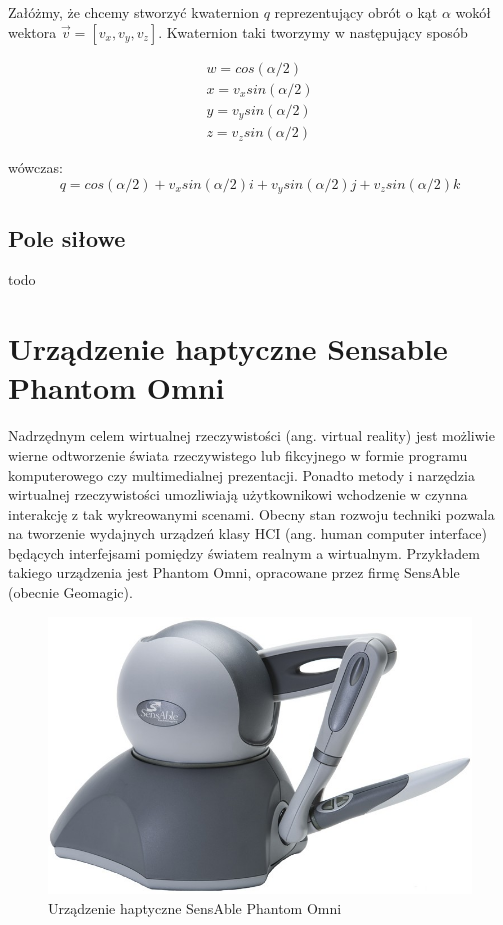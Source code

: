 \documentclass[licencjacka]{pracamgr}
\begin{document}
Załóżmy, że chcemy stworzyć kwaternion $q$ reprezentujący obrót o kąt $\alpha$ wokół wektora $\vec{v}=[v_x,v_y,v_z]$. Kwaternion taki tworzymy w następujący sposób

$$
\begin{array}{lr}
w=cos(\alpha/2) \\
x=v_x sin(\alpha/2) \\
y=v_y sin(\alpha/2) \\
z=v_z sin(\alpha/2) 
\end{array}
$$

wówczas:
$$
q=cos(\alpha/2)+v_xsin(\alpha/2)i+v_ysin(\alpha/2)j+v_zsin(\alpha/2)k
$$


\section{Pole siłowe}
todo
	
\chapter{Urządzenie haptyczne Sensable Phantom Omni}
Nadrzędnym celem wirtualnej rzeczywistości (ang. virtual reality) jest możliwie wierne odtworzenie świata rzeczywistego lub fikcyjnego w formie programu komputerowego czy multimedialnej prezentacji. Ponadto metody i narzędzia wirtualnej rzeczywistości umozliwiają użytkownikowi wchodzenie w czynna interakcję z tak wykreowanymi scenami. Obecny stan rozwoju techniki pozwala na tworzenie wydajnych urządzeń klasy HCI (ang. human computer interface) będących interfejsami pomiędzy światem realnym a wirtualnym. Przykładem takiego urządzenia jest Phantom Omni, opracowane przez firmę SensAble (obecnie Geomagic). 

\begin{figure}[H]
\centering
\includegraphics[scale=0.5,center]{Sensable_Phantom_Omni}
\caption{Urządzenie haptyczne SensAble Phantom Omni}
\end{figure}
\end{document}

